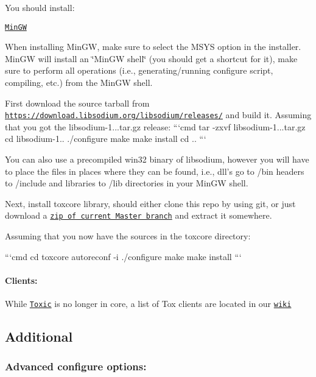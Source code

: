You should install\+:
\begin{DoxyItemize}
\item \href{http://sourceforge.net/projects/mingw/}{\tt Min\+G\+W}
\end{DoxyItemize}

When installing Min\+G\+W, make sure to select the M\+S\+Y\+S option in the installer. Min\+G\+W will install an \char`\"{}\+Min\+G\+W shell\char`\"{} (you should get a shortcut for it), make sure to perform all operations (i.\+e., generating/running configure script, compiling, etc.) from the Min\+G\+W shell.

First download the source tarball from \href{https://download.libsodium.org/libsodium/releases/}{\tt https\+://download.\+libsodium.\+org/libsodium/releases/} and build it. Assuming that you got the libsodium-\/1...\+tar.\+gz release\+: ```cmd tar -\/zxvf libsodium-\/1...\+tar.\+gz cd libsodium-\/1.. ./configure make make install cd .. ```

You can also use a precompiled win32 binary of libsodium, however you will have to place the files in places where they can be found, i.\+e., dll's go to /bin headers to /include and libraries to /lib directories in your Min\+G\+W shell.

Next, install toxcore library, should either clone this repo by using git, or just download a \href{https://github.com/irungentoo/toxcore/archive/master.zip}{\tt zip of current Master branch} and extract it somewhere.

Assuming that you now have the sources in the toxcore directory\+:

```cmd cd toxcore autoreconf -\/i ./configure make make install ```

\label{_Clients}%
 \paragraph*{Clients\+:}

While \href{https://github.com/tox/toxic}{\tt Toxic} is no longer in core, a list of Tox clients are located in our \href{https://wiki.tox.chat/doku.php?id=clients}{\tt wiki}

\label{_additional}%
 \subsection*{Additional}

\label{_aconf}%
 \subsubsection*{Advanced configure options\+:}


